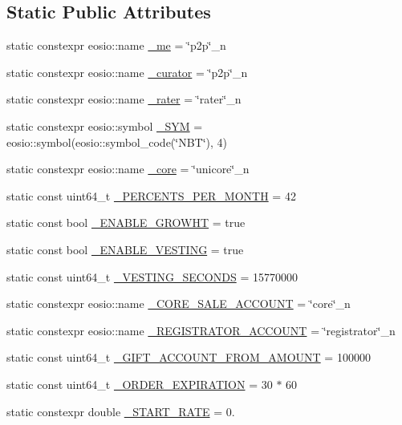 \subsection*{Static Public Attributes}
\begin{DoxyCompactItemize}
\item 
static constexpr eosio\+::name \mbox{\hyperlink{classp2p_ade9426b6e05cdb60d41e808717199b89}{\+\_\+me}} = \char`\"{}p2p\char`\"{}\+\_\+n
\item 
static constexpr eosio\+::name \mbox{\hyperlink{classp2p_aa5528a78186585c3a033d89b6c027a5b}{\+\_\+curator}} = \char`\"{}p2p\char`\"{}\+\_\+n
\item 
static constexpr eosio\+::name \mbox{\hyperlink{classp2p_abaf26be47ba132e33bdadf4a6f65a052}{\+\_\+rater}} = \char`\"{}rater\char`\"{}\+\_\+n
\item 
static constexpr eosio\+::symbol \mbox{\hyperlink{classp2p_afe8d32633b8a87ce35209184d222f6de}{\+\_\+\+S\+YM}} = eosio\+::symbol(eosio\+::symbol\+\_\+code(\char`\"{}N\+BT\char`\"{}), 4)
\item 
static constexpr eosio\+::name \mbox{\hyperlink{classp2p_a582434add36ca36a326bdab9e7c8cb4e}{\+\_\+core}} = \char`\"{}unicore\char`\"{}\+\_\+n
\item 
static const uint64\+\_\+t \mbox{\hyperlink{classp2p_a6a7a6607c93e930cfa3984a8c318942b}{\+\_\+\+P\+E\+R\+C\+E\+N\+T\+S\+\_\+\+P\+E\+R\+\_\+\+M\+O\+N\+TH}} = 42
\item 
static const bool \mbox{\hyperlink{classp2p_a738ddf63d1276c74f28b7d2f51ba1475}{\+\_\+\+E\+N\+A\+B\+L\+E\+\_\+\+G\+R\+O\+W\+HT}} = true
\item 
static const bool \mbox{\hyperlink{classp2p_a817118e4e422393acc35439edb0187af}{\+\_\+\+E\+N\+A\+B\+L\+E\+\_\+\+V\+E\+S\+T\+I\+NG}} = true
\item 
static const uint64\+\_\+t \mbox{\hyperlink{classp2p_af52bcfc4c42cb8a001ab4935d06539c0}{\+\_\+\+V\+E\+S\+T\+I\+N\+G\+\_\+\+S\+E\+C\+O\+N\+DS}} = 15770000
\item 
static constexpr eosio\+::name \mbox{\hyperlink{classp2p_aaf70e52c0f57cc4fa3d9d7fd0e8f0d99}{\+\_\+\+C\+O\+R\+E\+\_\+\+S\+A\+L\+E\+\_\+\+A\+C\+C\+O\+U\+NT}} = \char`\"{}core\char`\"{}\+\_\+n
\item 
static constexpr eosio\+::name \mbox{\hyperlink{classp2p_ad3c9fd465ea37d16657bd9910c631d22}{\+\_\+\+R\+E\+G\+I\+S\+T\+R\+A\+T\+O\+R\+\_\+\+A\+C\+C\+O\+U\+NT}} = \char`\"{}registrator\char`\"{}\+\_\+n
\item 
static const uint64\+\_\+t \mbox{\hyperlink{classp2p_ada18e95b855fa10dc57a33620b4dd51d}{\+\_\+\+G\+I\+F\+T\+\_\+\+A\+C\+C\+O\+U\+N\+T\+\_\+\+F\+R\+O\+M\+\_\+\+A\+M\+O\+U\+NT}} = 100000
\item 
static const uint64\+\_\+t \mbox{\hyperlink{classp2p_a714001f0f556d0db16b3746fa2261ddb}{\+\_\+\+O\+R\+D\+E\+R\+\_\+\+E\+X\+P\+I\+R\+A\+T\+I\+ON}} = 30 $\ast$ 60
\item 
static constexpr double \mbox{\hyperlink{classp2p_a41fd0523f7a4103ea012c69c376d0823}{\+\_\+\+S\+T\+A\+R\+T\+\_\+\+R\+A\+TE}} = 0.
\end{DoxyCompactItemize}


